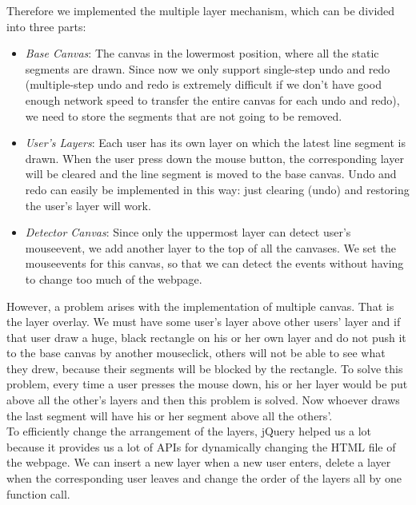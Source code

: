 \documentclass[a4paper,11pt,3p]{article}
\begin{document}
Therefore we implemented the multiple layer mechanism, which can be divided into three parts:\\
\begin{itemize}
\item
\emph{Base Canvas}: The canvas in the lowermost position, where all the static segments are drawn. 
Since now we only support single-step undo and redo (multiple-step undo and redo is extremely 
difficult if we don't have good enough network speed to transfer the entire canvas for each undo and 
redo), we need to store the segments that are not going to be removed.\\
\item
\emph{User's Layers}: Each user has its own layer on which the latest line segment is drawn. When the 
user press down the mouse button, the corresponding layer will be cleared and the line segment is moved 
to the base canvas. Undo and redo can easily be implemented in this way: just clearing (undo) and restoring 
the user's layer will work.\\
\item
\emph{Detector Canvas}: Since only the uppermost layer can detect user's mouseevent, we add another layer 
to the top of all the canvases. We set the mouseevents for this canvas, so that we can detect the 
events without having to change too much of the webpage.\\
\end{itemize}

However, a problem arises with the implementation of multiple canvas. That is the layer overlay. We must 
have some user's layer above other users' layer and if that user draw a huge, black rectangle on his or 
her own layer and do not push it to the base canvas by another mouseclick, others will not be able to see 
what they drew, because their segments will be blocked by the rectangle. To solve this problem, every time 
a user presses the mouse down, his or her layer would be put above all the other's layers and then this 
problem is solved. Now whoever draws the last segment will have his or her segment above all the others'.\\

To efficiently change the arrangement of the layers, jQuery helped us a lot because it provides us a lot 
of APIs for dynamically changing the HTML file of the webpage. We can insert a new layer when a new user 
enters, delete a layer when the corresponding user leaves and change the order of the layers all by one 
function call.\\
\end{document}
